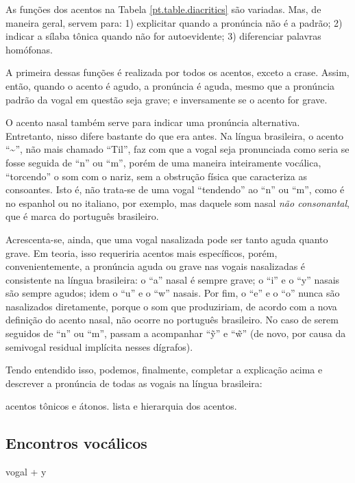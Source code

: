 \documentclass[12pt, a5paper, titlepage]{article}
\begin{document}
\begin{bilingualpages}
    \PtTableDiacritics

    As funções dos acentos na Tabela \ref{pt.table.diacritics} são variadas. Mas,
    de maneira geral, servem para: 1) explicitar quando a pronúncia não é a padrão;
    2) indicar a sílaba tônica quando não for autoevidente; 3) diferenciar palavras
    homófonas.

    A primeira dessas funções é realizada por todos os acentos, exceto a crase.
    Assim, então, quando o acento é agudo, a pronúncia é aguda, mesmo que a
    pronúncia padrão da vogal em questão seja grave; e inversamente se o acento for
    grave.

    O acento nasal também serve para indicar uma pronúncia alternativa. Entretanto,
    nisso difere bastante do que era antes. Na língua brasileira, o acento
    ``\textasciitilde'', não mais chamado ``Til'', faz com que a vogal seja
    pronunciada como seria se fosse seguida de ``n'' ou ``m'', porém de uma maneira
    inteiramente vocálica, ``torcendo'' o som com o nariz, sem a obstrução física
    que caracteriza as consoantes. Isto é, não trata-se de uma vogal ``tendendo''
    ao ``n'' ou ``m'', como é no espanhol ou no italiano, por exemplo, mas daquele
    som nasal \textit{não consonantal}, que é marca do português brasileiro.

    Acrescenta-se, ainda, que uma vogal nasalizada pode ser tanto aguda quanto
    grave. Em teoria, isso requeriria acentos mais específicos, porém,
    convenientemente, a pronúncia aguda ou grave nas vogais nasalizadas é
    consistente na língua brasileira: o ``a'' nasal é sempre grave; o ``i'' e o
    ``y'' nasais são sempre agudos; idem o ``u'' e o ``w'' nasais. Por fim, o ``e''
    e o ``o'' nunca são nasalizados diretamente, porque o som que produziriam, de
    acordo com a nova definição do acento nasal, não ocorre no português
    brasileiro. No caso de serem seguidos de ``n'' ou ``m'', passam a acompanhar
    ``\~y'' e ``\~w'' (de novo, por causa da semivogal residual implícita nesses
    dígrafos).

    Tendo entendido isso, podemos, finalmente, completar a explicação acima e
    descrever a pronúncia de todas as vogais na língua brasileira:

    \PtTableVowelsFull

    acentos tônicos e átonos. lista e hierarquia dos acentos.

    \subsection{Encontros vocálicos}
    vogal + y


\end{bilingualpages}
\end{document}
